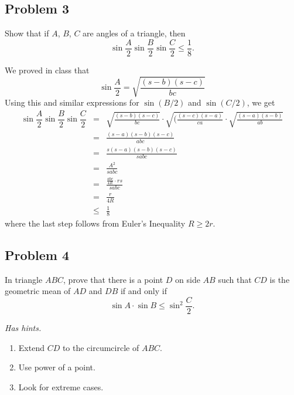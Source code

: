 \subsection{Problem 3}
Show that if $A$, $B$, $C$ are angles of a triangle, then
\[
\sin \dfrac A2 \sin \dfrac B2 \sin \dfrac C2 \leq \dfrac 18.
\]

\begin{mdsoln}
    We proved in class that$$\sin \dfrac A2=\sqrt{\frac{(s-b)(s-c)}{bc}}$$Using this and similar expressions for $\sin (B/2)$ and $\sin (C/2)$, we get\begin{eqnarray*}\sin \dfrac A2 \sin \dfrac B2 \sin \dfrac C2&=&\sqrt {\frac {(s - b)(s - c)}{bc}} \cdot \sqrt {(\frac {(s - c)(s - a)}{ca}} \cdot \sqrt {\frac {(s - a)(s - b)}{ab}}\\ &=& \frac{(s-a)(s-b)(s-c)}{abc}\\ &=&\frac{s(s-a)(s-b)(s-c)}{sabc}\\ &=&\frac{A^2}{sabc}\\ &=&\frac{\frac{abc}{4R}\cdot rs}{sabc}\\ &=&\frac{r}{4R}\\ &\le &\frac{1}{8}\end{eqnarray*}where the last step follows from Euler’s Inequality $R\ge 2r$.
\end{mdsoln}



\subsection{Problem 4}
In triangle $ABC$, prove that there is a point $D$ on side $AB$ such that $CD$ is the geometric mean of $AD$ and $DB$ if and only if
\[
\sin A \cdot \sin B \leq \sin^2 \dfrac C2 .
\]



\textit{Has hints.}
\begin{sketch}
    \begin{enumerate}
        \item Extend $CD$ to the circumcircle of $ABC$.
        \item Use power of a point.
        \item Look for extreme cases.
    \end{enumerate}
\end{sketch}

